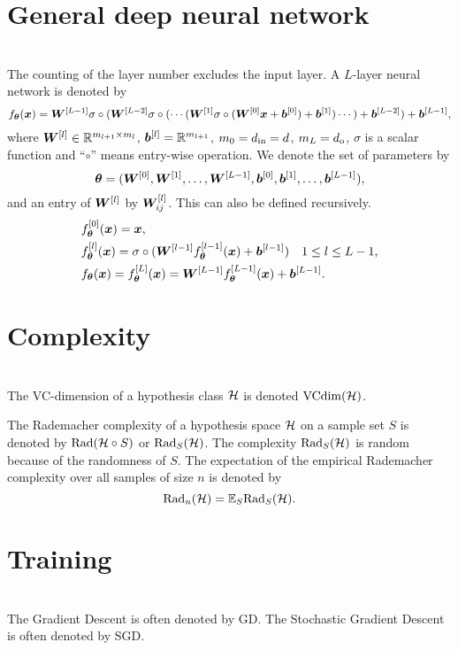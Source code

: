 \documentclass[]{article}
\begin{document}
\section{General deep neural network}~\\
The counting of the layer number excludes the input layer. A $L$-layer neural network is denoted by
\begin{equation}
    f_{\bm{\theta}}(\bm{x}) = \bm{W}^{[L-1]} \sigma\circ(\bm{W}^{[L-2]}\sigma\circ(\cdots (\bm{W}^{[1]} \sigma\circ(\bm{W}^{[0]} \bm{x} + \bm{b}^{[0]} ) + \bm{b}^{[1]} )\cdots)+\bm{b}^{[L-2]})+\bm{b}^{[L-1]},
\end{equation}
where $\bm{W}^{[l]} \in \mathbb{R}^{m_{l+1}\times m_{l}}$, $\bm{b}^{[l]}=\mathbb{R}^{m_{l+1}}$, $m_0=d_{\rm in}=d$, $m_{L}=d_{\rm o}$,
$\sigma$ is a scalar function and ``$\circ$'' means entry-wise operation. 
We denote the set of parameters by \[
\bm{\theta}=(\bm{W}^{[0]},\bm{W}^{[1]},\ldots,\bm{W}^{[L-1]},\bm{b}^{[0]},\bm{b}^{[1]},\ldots,\bm{b}^{[L-1]}),
\] 
and  an entry of $\bm{W}^{[l]}$ by   $\bm{W}^{[l]}_{ij}$. This can also be defined recursively.
\begin{align}
    &f_{\bm{\theta}}^{[0]}(\bm{x})=\bm{x}, \\
    &f_{\bm{\theta}}^{[l]}(\bm{x})=\sigma\circ(\bm{W}^{[l-1]} f_{\bm{\theta}}^{[l-1]}(\bm{x}) + \bm{b}^{[l-1]}) \quad 1\leq l\leq L-1,\\
    &f_{\bm{\theta}}(\bm{x})=f_{\bm{\theta}}^{[L]}(\bm{x})=\bm{W}^{[L-1]} f_{\bm{\theta}}^{[L-1]}(\bm{x}) + \bm{b}^{[L-1]}.
\end{align}

\section{Complexity}~\\
The VC-dimension of a hypothesis class $\mathcal{H}$ is denoted ${\rm VCdim}(\mathcal{H})$.

The Rademacher complexity of a hypothesis space $\mathcal{H}$ on a sample set $S$ is denoted by ${\rm Rad} (\mathcal{H}\circ S)$ or ${\rm Rad}_{S} (\mathcal{H})$. The complexity ${\rm Rad}_{S} (\mathcal{H})$ is random because of the randomness of $S$. The expectation of the empirical Rademacher complexity over all samples of size $n$ is denoted by 
\[
{\rm Rad}_{n} (\mathcal{H})=\mathbb{E}_{S} {\rm Rad}_{S} (\mathcal{H}).
\]

\section{Training}~\\
The Gradient Descent is often denoted by GD. The Stochastic Gradient Descent is often denoted by SGD. 
\end{document}
